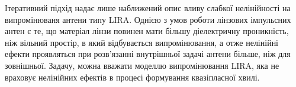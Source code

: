 Ітеративний підхід надає лише наближений опис вливу слабкої нелінійності на
випромінюваня антени типу LIRA. Однією з умов роботи лінзових імпульсних 
антен є те, що матеріал лінзи повинен мати більшу діелектричну проникність, 
ніж вільний простір, в який відбувається випромінювання, а отже нелінійні 
ефекти проявляться при розв'язанні внутрішньої задачі антени більше, ніж 
для зовнішньої. Задачу, можна вважати моделлю випромінювання LIRA, яка 
не враховує нелінійних ефектів в процесі формування квазіпласної хвилі.

%
%
%
%
